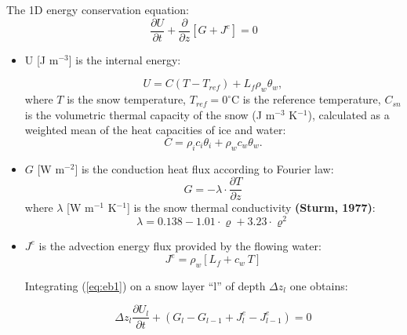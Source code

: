 The 1D energy conservation equation:
\begin{equation}\label{eq:eb1}
\frac{\partial U}{\partial t} + \frac{\partial}{\partial z} \left[G+J^e \right]=0 
\end{equation}
%
\begin{itemize}
\item U [J m$^{-3}$] is the internal energy:

\begin{equation}\label{u1}
U=C \left(T-T_{ref}\right) + L_f \rho_{w} \theta_{w},
\end{equation}
where $T$ is the snow temperature, $T_{ref}=0^\circ$C is the reference temperature,  $C_{sn}$ is the volumetric thermal capacity of the snow (J m$^{-3}$ K$^{-1}$), calculated as a weighted mean of the heat capacities of ice and water:
\begin{equation}
C=\rho_i c_i \theta_i + \rho_w c_w \theta_w.
\end{equation}


\item $G$ [W m$^{-2}$] is the conduction heat flux according to Fourier law:
\begin{equation}\label{}
G=- \lambda \cdot  \frac{\partial T}{\partial z}
\end{equation}
%
\noindent where $\lambda$ [W m$^{-1}$ K$^{-1}$] is the snow thermal conductivity {\bf (Sturm, 1977)}:
\begin{equation}\label{}
\lambda= 0.138 - 1.01 \cdot \varrho + 3.23 \cdot \varrho^2
\end{equation}
%



\item $J^e$ is the advection energy flux provided by the flowing water:
\begin{equation}\label{}
J^e=\rho_w \left[L_f + c_w \ T \right]
\end{equation}
%

\noindent Integrating (\ref{eq:eb1}) on a snow layer ``l'' of depth $\Delta z_l$ one obtains:

\begin{equation}\label{eq:eb2}
\Delta z_l \frac{\partial U_l}{\partial t}+ \left(G_l - G_{l-1} + J_l^e -J_{l-1}^e \right) =0
\end{equation}

\end{itemize}






